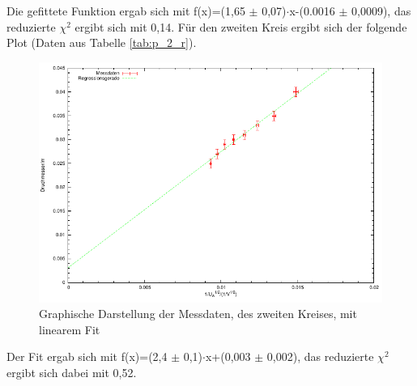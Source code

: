 \documentclass[12pt,a4paper]{article}
\begin{document}
Die gefittete Funktion ergab sich mit f(x)=(1,65 $\pm$ 0,07)$\cdot$x-(0.0016 $\pm$ 0,0009), das reduzierte $\chi^2$ ergibt sich mit 0,14.
\newpage
Für den zweiten Kreis ergibt sich der folgende Plot (Daten aus Tabelle \ref{tab:p_2_r}).
\begin{figure}[H] 
  \centering
    \includegraphics[scale = 1]{kreis_2.pdf}
  	\caption[Graphische Darstellung der Messdaten, des zweiten Kreises, mit linearem Fit]{Graphische Darstellung der Messdaten, des zweiten Kreises, mit linearem Fit}
  \label{fig:plot_1}
\end{figure}

Der Fit ergab sich mit f(x)=(2,4 $\pm$ 0,1)$\cdot$x+(0,003 $\pm$ 0,002), das reduzierte $\chi^2$ ergibt sich dabei mit 0,52.
\end{document}

